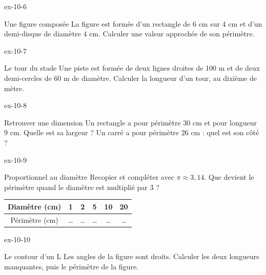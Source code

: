 \begin{blocLivre}{ex-10-6}\begin{exercice}[2]{Une figure composée}
La figure est formée d’un rectangle de 6 cm sur 4 cm et d’un demi-disque de diamètre 4 cm. Calculer une valeur approchée de son périmètre.
\label{fig-ex-10-6}
\end{exercice}\end{blocLivre}
\begin{blocLivre}{ex-10-7}\begin{exercice}[2]{Le tour du stade}
Une piste est formée de deux lignes droites de 100 m et de deux demi-cercles de 60 m de diamètre. Calculer la longueur d’un tour, au dixième de mètre.
\label{fig-ex-10-7}
\end{exercice}\end{blocLivre}
\begin{blocLivre}{ex-10-8}\begin{exercice}[2]{Retrouver une dimension}
Un rectangle a pour périmètre 30 cm et pour longueur 9 cm. Quelle est sa largeur ? Un carré a pour périmètre 26 cm : quel est son côté ?
\end{exercice}\end{blocLivre}
\begin{blocLivre}{ex-10-9}\begin{exercice}[2]{Proportionnel au diamètre}
Recopier et compléter avec $\pi\approx3{,}14$. Que devient le périmètre quand le diamètre est multiplié par 3 ?\begin{center}\renewcommand{\arraystretch}{1.35}\begin{tabular}{c|ccccc}\toprule
Diamètre (cm) & 1 & 2 & 5 & 10 & 20\\\midrule
Périmètre (cm) & … & … & … & … & …\\
\bottomrule\end{tabular}\end{center}
\end{exercice}\end{blocLivre}
\begin{blocLivre}{ex-10-10}\begin{exercice}[2]{Le contour d’un L}
Les angles de la figure sont droits. Calculer les deux longueurs manquantes, puis le périmètre de la figure.
\label{fig-ex-10-10}
\end{exercice}\end{blocLivre}


